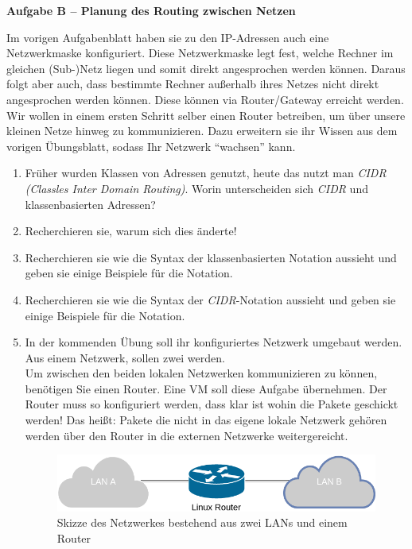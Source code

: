 \documentclass[paper=a4,fontsize=11pt]{scrartcl}%
\numberwithin{equation}{section}
\begin{document}
\begin{center}
\Large{\textbf{Aufgabe B -- Planung des Routing zwischen Netzen}}
\end{center}
\vskip0.25in
Im vorigen Aufgabenblatt haben sie zu den IP-Adressen auch eine Netzwerkmaske konfiguriert. Diese Netzwerkmaske legt fest, welche Rechner im gleichen (Sub-)Netz liegen und somit direkt angesprochen werden können. Daraus folgt aber auch, dass bestimmte Rechner außerhalb ihres Netzes nicht direkt angesprochen werden können. Diese können via Router/Gateway erreicht werden.\\
Wir wollen in einem ersten Schritt selber einen Router betreiben, um über unsere kleinen Netze hinweg zu kommunizieren. Dazu erweitern sie ihr Wissen aus dem vorigen Übungsblatt, sodass Ihr Netzwerk \enquote{wachsen} kann.
\begin{enumerate}
	\item Früher wurden Klassen von Adressen genutzt, heute das nutzt man \emph{CIDR (Classles Inter Domain Routing)}. Worin unterscheiden sich \emph{CIDR} und klassenbasierten Adressen?
	\item Recherchieren sie, warum sich dies änderte!
	\item Recherchieren sie wie die Syntax der klassenbasierten Notation aussieht und geben sie einige Beispiele für die Notation.
	\item Recherchieren sie wie die Syntax der \emph{CIDR}-Notation aussieht und geben sie einige Beispiele für die Notation.
	\item In der kommenden Übung soll ihr konfiguriertes Netzwerk umgebaut werden. Aus einem Netzwerk, sollen zwei werden.\\
	Um zwischen den beiden lokalen Netzwerken kommunizieren zu können, benötigen Sie einen Router. Eine VM soll diese Aufgabe übernehmen. Der Router muss so konfiguriert werden, dass klar ist wohin die Pakete geschickt werden! Das heißt: Pakete die nicht in das eigene lokale Netzwerk gehören werden über den Router in die externen Netzwerke weitergereicht.
	\begin{figure}[h]
	\centering
	\includegraphics[scale=0.35]{lan}
	\caption{Skizze des Netzwerkes bestehend aus zwei LANs und einem Router}
	\end{figure}

\end{enumerate}
\end{document}
